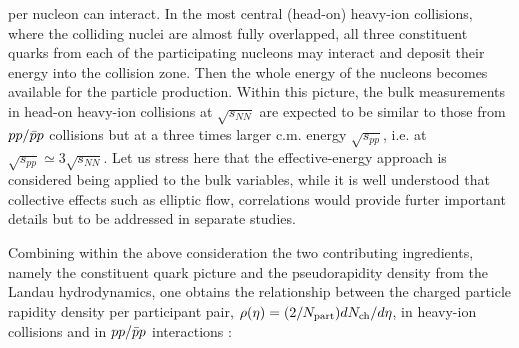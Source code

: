 \documentclass[twocolumn,showpacs,preprintnumbers,prd,superscriptaddress,nofootinbib]{revtex4}
\begin{document}
per nucleon can interact. 
 In 
 the most central (head-on) heavy-ion collisions, 
 where the colliding nuclei are almost fully overlapped, 
 all three constituent quarks from each of the participating nucleons 
 may interact 
  and deposit their energy 
 into the collision zone.
  Then
the whole energy of the 
 nucleons 
 becomes available for the 
 particle production.  
  Within this picture,
 the 
 bulk 
 measurements
 in 
 head-on heavy-ion collisions 
 at 
 $\sqrt{s_{NN}}$
 are 
 expected 
 to be similar to 
  those from
 $pp/{\bar p}p$ collisions 
but at 
  a
 three times larger 
 c.m. energy $\sqrt{s_{pp}}$, 
  i.e. 
 at 
 $\sqrt{s_{pp}} \simeq 
 3\sqrt{s_{NN}}$.
 Let us stress here that the effective-energy approach is considered 
being applied to the bulk variables, while it is well understood that 
collective effects such as elliptic flow, correlations would provide 
furter important details but to be addressed in separate studies.

 Combining 
 within the above consideration
 the 
 two contributing 
 ingredients, namely the 
 constituent quark picture and  the pseudorapidity density 
 from the Landau hydrodynamics, 
  one obtains 
 the relationship between 
 the 
charged particle rapidity density
per participant pair, 
 $\rho(\eta)=(2/N_{\rm{part}})dN_{\rm{ch}}/d\eta$, 
in heavy-ion 
 collisions  and in  $pp/{\bar p}p$  
 interactions :
\end{document}
